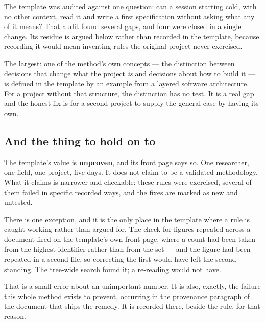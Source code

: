 The template was audited against one question: can a session starting cold, with no other context, read it and write a first specification without asking what any of it means? That audit found several gaps, and four were closed in a single change. Its residue is argued below rather than recorded in the template, because recording it would mean inventing rules the original project never exercised.

The largest: one of the method's own concepts --- the distinction between decisions that change what the project \textit{is} and decisions about how to build it --- is defined in the template by an example from a layered software architecture. For a project without that structure, the distinction has no test. It is a real gap and the honest fix is for a second project to supply the general case by having its own.

\subsection{And the thing to hold on to}

The template's value is \textbf{unproven}, and its front page says so. One researcher, one field, one project, five days. It does not claim to be a validated methodology. What it claims is narrower and checkable: these rules were exercised, several of them failed in specific recorded ways, and the fixes are marked as new and untested.

There is one exception, and it is the only place in the template where a rule is caught working rather than argued for. The check for figures repeated across a document fired on the template's own front page, where a count had been taken from the highest identifier rather than from the set --- and the figure had been repeated in a second file, so correcting the first would have left the second standing. The tree-wide search found it; a re-reading would not have.

That is a small error about an unimportant number. It is also, exactly, the failure this whole method exists to prevent, occurring in the provenance paragraph of the document that ships the remedy. It is recorded there, beside the rule, for that reason.
